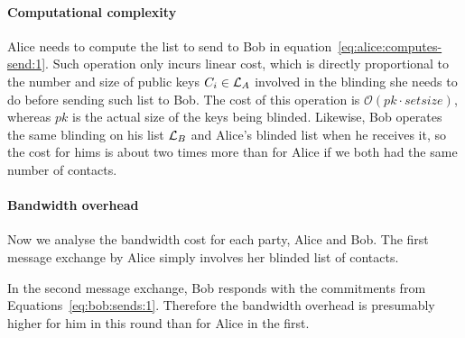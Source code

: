\documentclass{article}
\begin{document}
\paragraph{Computational complexity}
%
Alice needs to compute the list to send to Bob in
equation~\ref{eq:alice:computes-send:1}. Such operation only incurs
linear cost, which is directly proportional to the number and size of
public keys $C_i\in {\cal L}_A$ involved in the blinding she needs to do
before sending such list to Bob. The cost of this operation is
$\mathcal{O}(pk \cdot setsize)$, whereas $pk$ is the actual size
of the keys being blinded. Likewise, Bob operates the same blinding on his list
${\cal L}_B$ and Alice's blinded list when he receives it, so the cost
for hims is about two times more than for Alice if we both had the
same number of contacts.


\medskip
\paragraph{Bandwidth overhead}
%
Now we analyse the bandwidth cost for each party, Alice and Bob.  The
first message exchange by Alice simply involves her blinded list of
contacts.

In the second message exchange, Bob responds with the commitments from
Equations~\ref{eq:bob:sends:1}. Therefore the bandwidth overhead is
presumably higher for him in this round than for Alice in the first.

\end{document}
